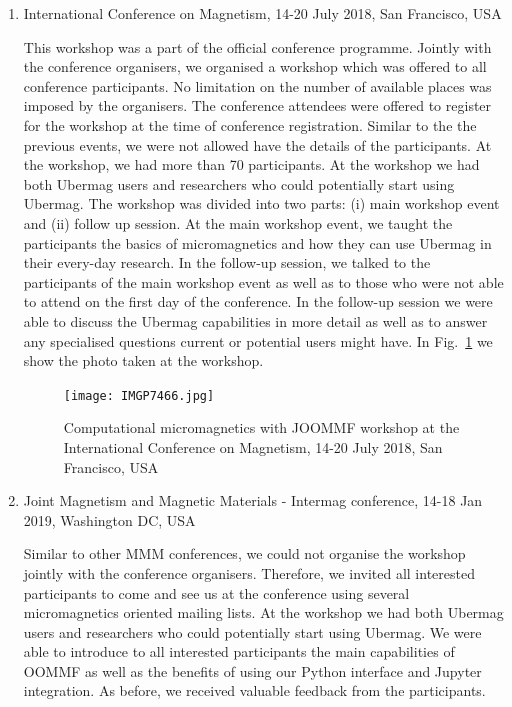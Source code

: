 \documentclass{deliverablereport}
\begin{document}
\begin{enumerate}
\item International Conference on Magnetism, 14-20 July 2018, San
Francisco, USA

    This workshop was a part of the official conference
    programme. Jointly with the conference organisers, we organised a
    workshop which was offered to all conference participants. No
    limitation on the number of available places was imposed by the
    organisers. The conference attendees were offered to register for
    the workshop at the time of conference registration. Similar to
    the the previous events, we were not allowed have the details of
    the participants. At the workshop, we had more than 70
    participants. At the workshop we had both Ubermag users and
    researchers who could potentially start using Ubermag. The
    workshop was divided into two parts: (i) main workshop event and
    (ii) follow up session. At the main workshop event, we taught the
    participants the basics of micromagnetics and how they can use
    Ubermag in their every-day research. In the follow-up session, we
    talked to the participants of the main workshop event as well as
    to those who were not able to attend on the first day of the
    conference. In the follow-up session we were able to discuss the
    Ubermag capabilities in more detail as well as to answer any
    specialised questions current or potential users might have. In
    Fig.~\ref{fig:icm-workshop} we show the photo taken at the
    workshop.

    \begin{figure}
      \texttt{[image: IMGP7466.jpg]}
  \caption{\label{fig:icm-workshop} Computational micromagnetics with
    JOOMMF workshop at the International Conference on Magnetism,
    14-20 July 2018, San Francisco, USA}
    \end{figure}

\item Joint Magnetism and Magnetic Materials - Intermag conference,
14-18 Jan 2019, Washington DC, USA

    Similar to other MMM conferences, we could not organise the
workshop jointly with the conference organisers. Therefore, we invited
all interested participants to come and see us at the conference using
several micromagnetics oriented mailing lists. At the workshop we had
both Ubermag users and researchers who could potentially start using
Ubermag. We were able to introduce to all interested participants the
main capabilities of OOMMF as well as the benefits of using our Python
interface and Jupyter integration. As before, we received valuable
feedback from the participants.

\end{enumerate}
\end{document}
